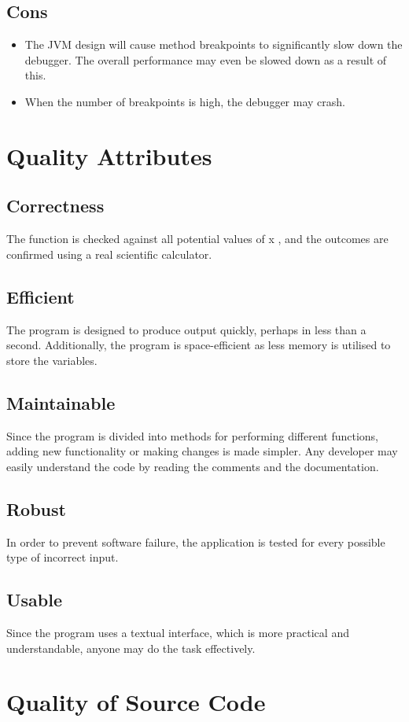 \documentclass{article}
\begin{document}
    \subsection{Cons}
    \begin{itemize}
        \item The JVM design will cause method breakpoints to significantly slow down the debugger. The overall performance may even be slowed down as a result of this.
        \item When the number of breakpoints is high, the debugger may crash.
    \end{itemize}
    \section{Quality Attributes}
    \subsection{Correctness}
    The function is checked against all potential values of x , and the outcomes are confirmed using a real scientific calculator.
    \subsection{Efficient}
    The program is designed to produce output quickly, perhaps in less than a second. Additionally, the program is space-efficient as less memory is utilised to store the variables.
    \subsection{Maintainable}
    Since the program is divided into methods for performing different functions, adding new functionality or making changes is made simpler. Any developer may easily understand the code by reading the comments and the documentation.
    \subsection{Robust}
    In order to prevent software failure, the application is tested for every possible type of incorrect input.
    \subsection{Usable}
    Since the program uses a textual interface, which is more practical and understandable, anyone may do the task effectively.
    \section{Quality of Source Code}
\end{document}
